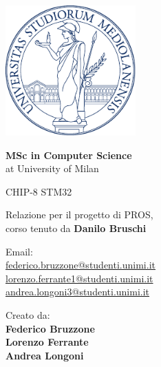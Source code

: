 \documentclass[a4paper]{article}
\begin{document}

\begin{titlepage}
    \begin{center}
        \includegraphics[height=5cm]{minerva.pdf}

        \vspace*{1.75cm}

        \LARGE

        \textbf{MSc in Computer Science} \\
        at University of Milan

        \vspace*{1cm}

        \huge
        CHIP-8 STM32

        \large Relazione per il progetto di PROS, \\
        corso tenuto da \textbf{Danilo Bruschi}

        \normalsize
        \vspace*{4cm}

        \begin{minipage}[t]{0.47\textwidth}
            {Email: } \vspace{0.3em} \\
            {\large \href{federico.bruzzone@studenti.unimi.it}{federico.bruzzone@studenti.unimi.it}} \vspace{1em}  \\
            {\large \href{lorenzo.ferrante1@studenti.unimi.it}{lorenzo.ferrante1@studenti.unimi.it}} \vspace{1em}  \\
            {\large \href{andrea.longoni3@studenti.unimi.it}{andrea.longoni3@studenti.unimi.it}} \vspace{1em}  \\
        \end{minipage}
        \hfill
        \begin{minipage}[t]{0.47\textwidth}\raggedleft
            {Creato da:} \hspace{-0.9em} \vspace{0.3em} \\
            {\large \textbf{Federico Bruzzone}} \\
            \vspace{1em}
            {\large \textbf{Lorenzo Ferrante}} \\
            \vspace{1em}
            {\large \textbf{Andrea Longoni}}
        \end{minipage}


\end{center}
\end{titlepage}
\end{document}
